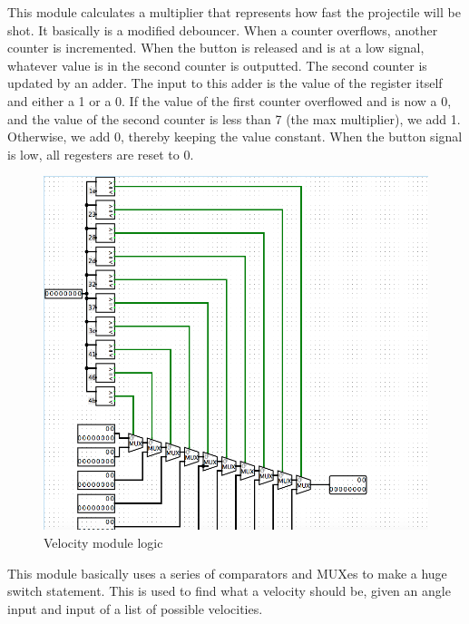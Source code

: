 \documentclass{article}
\begin{document}
This module calculates a multiplier that represents how fast the projectile will be shot. It basically is a modified debouncer. When a counter overflows, another counter is incremented. When the button is released and is at a low signal, whatever value is in the second counter is outputted. The second counter is updated by an adder. The input to this adder is the value of the register itself and either a 1 or a 0. If the value of the first counter overflowed and is now a 0, and the value of the second counter is less than 7 (the max multiplier), we add 1. Otherwise, we add 0, thereby keeping the value constant. When the button signal is low, all regesters are reset to 0. 

\begin{figure}[H]
	\begin{center}
		\includegraphics[width=1\textwidth]{prienc.png} 
		\caption{Velocity module logic}
	\end{center}
\end{figure}

This module basically uses a series of comparators and MUXes to make a huge switch statement. This is used to find what a velocity should be, given an angle input and input of a list of possible velocities.
\end{document}
